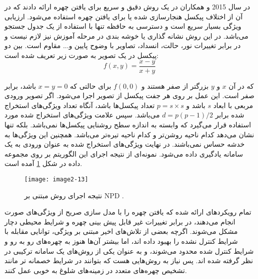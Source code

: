 \noindent
در سال 2015  و همکاران در \cite{7130626} یک روش دقیق و سریع برای یافتن چهره ارائه دادند که در آن از اختلاف پیکسل هنجارسازی شده یا  برای یافتن چهره استفاده می‌شود. ارزیابی ویژگی  بسیار سریع است و دسترسی به حافظه تنها با استفاده از یک جدول جستجو می‌باشد. در این روش نشانه گذاری یا خوشه بندی در مرحله آموزش نیز لازم نیست و در برابر تغییرات نور، حالت، انسداد، تصاویر با وضوح پایین و... مقاوم است.  بین دو پیکسل در یک تصویر به صورت زیر تعریف شده است:
\begin{equation}\label{eq2-6}
f(x, y) = \frac{x - y}{x + y}
\end{equation}

\noindent
که در آن $x$ و $y$ بزرگتر از صفر هستند و $f(0,0)$ برای حالتی که $x = y = 0$ باشد، برابر صفر است. این عمل بر روی هر جفت پیکسل از تصویر اجرا می‌شود. اگر تصویر ورودی مربعی با ابعاد $s$ باشد و $p=s \times s$ تعداد پیکسل‌ها باشد، آنگاه تعداد ویژگی‌های استخراج شده برابر $d=p(p-1)/2$ می‌باشد. سپس علامت  ویژگی‌های استخراج شده مورد استفاده قرار می‌گیرد که وابسته به اندازه سطح روشنایی پیکسل‌ها نمی‌باشد. بلکه تنها نشان می‌دهد کدام ناحیه روشن‌تر و کدام ناحیه تیره‌تر می‌باشد. همچنین این ویژگی‌ها به خدشه  حساس نمی‌باشند. در نهایت ویژگی‌های استخراج شده به عنوان ورودی به یک سامانه یادگیری داده می‌شود. نمونه‌ای از نتیجه اجرای این الگوریتم بر روی مجموعه داده  در شکل \ref{image2-13} آمده است.
 
 \begin{figure}[h]
\centering
  \texttt{[image: image2-13]}
  \caption{نتیجه اجرای روش مبتنی بر NPD \cite{7130626}.}
  \label{image2-13}
\end{figure}

\noindent
تمام رویکرد‌های ارائه شده که یافتن چهره را با مدل سازی صریح از ویژگی‌های صورت انجام می‌دهند، در برابر تغییرات غیر قابل پیش بینی چهره و شرایط محیطی دچار مشکل می‌شوند. اگرچه بعضی از تلاش‌های اخیر مبتنی بر ویژگی، توانایی مقابله با شرایط کنترل نشده را بهبود داده اند، اما بیشتر آن‌ها هنوز به چهره‌های رو به رو و شرایط کنترل شده محدود می‌شوند، و به عنوان یکی از روش‌های یک سامانه ترکیبی در نظر گرفته شده اند. پس نیاز به روش‌هایی هست که بتوانند در شرایط خصمانه تر مانند تشخیص چهره‌های متعدد در زمینه‌های شلوغ به خوبی عمل کنند.

